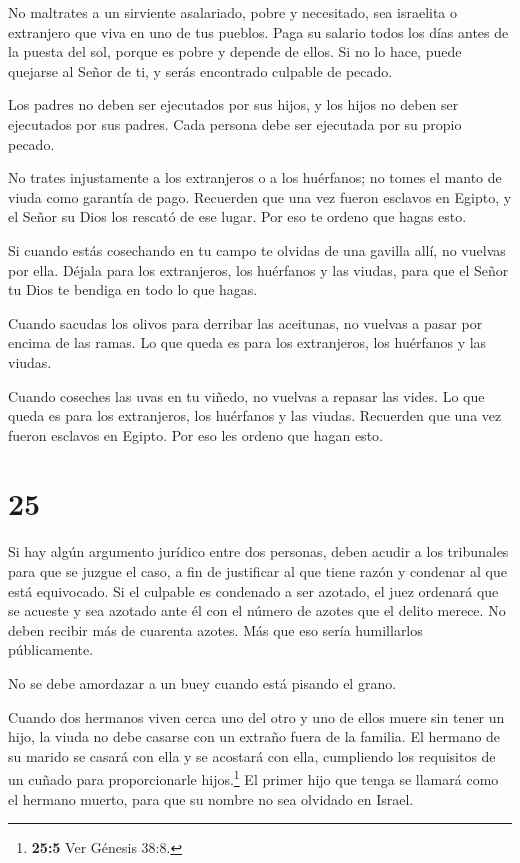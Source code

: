  No maltrates a un sirviente asalariado, pobre y
necesitado, sea israelita o extranjero que viva en uno de tus pueblos.
 Paga su salario todos los días antes de la puesta del sol,
porque es pobre y depende de ellos. Si no lo hace, puede quejarse al
Señor de ti, y serás encontrado culpable de pecado.

 Los padres no deben ser ejecutados por sus hijos, y los
hijos no deben ser ejecutados por sus padres. Cada persona debe ser
ejecutada por su propio pecado.

 No trates injustamente a los extranjeros o a los
huérfanos; no tomes el manto de viuda como garantía de pago.
 Recuerden que una vez fueron esclavos en Egipto, y el
Señor su Dios los rescató de ese lugar. Por eso te ordeno que hagas
esto.

 Si cuando estás cosechando en tu campo te olvidas de una
gavilla allí, no vuelvas por ella. Déjala para los extranjeros, los
huérfanos y las viudas, para que el Señor tu Dios te bendiga en todo lo
que hagas.

 Cuando sacudas los olivos para derribar las aceitunas, no
vuelvas a pasar por encima de las ramas. Lo que queda es para los
extranjeros, los huérfanos y las viudas.

 Cuando coseches las uvas en tu viñedo, no vuelvas a
repasar las vides. Lo que queda es para los extranjeros, los huérfanos y
las viudas.  Recuerden que una vez fueron esclavos en
Egipto. Por eso les ordeno que hagan esto.

\hypertarget{section-24}{%
\section{25}\label{section-24}}

 Si hay algún argumento jurídico entre dos personas, deben
acudir a los tribunales para que se juzgue el caso, a fin de justificar
al que tiene razón y condenar al que está equivocado.  Si el
culpable es condenado a ser azotado, el juez ordenará que se acueste y
sea azotado ante él con el número de azotes que el delito merece.
 No deben recibir más de cuarenta azotes. Más que eso sería
humillarlos públicamente.

 No se debe amordazar a un buey cuando está pisando el
grano.

 Cuando dos hermanos viven cerca uno del otro y uno de ellos
muere sin tener un hijo, la viuda no debe casarse con un extraño fuera
de la familia. El hermano de su marido se casará con ella y se acostará
con ella, cumpliendo los requisitos de un cuñado para proporcionarle
hijos.\footnote{\textbf{25:5} Ver Génesis 38:8.}  El primer
hijo que tenga se llamará como el hermano muerto, para que su nombre no
sea olvidado en Israel.

